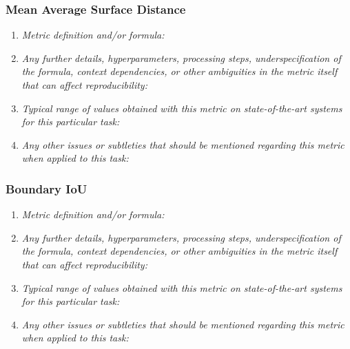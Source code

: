 \documentclass[a4paper,11pt]{article}
\begin{document}
        \subsubsection{Mean Average Surface Distance}
            \begin{enumerate}[label=\alph*.]
                \item \textit{Metric definition and/or formula:}
                \bigskip
                \item \textit{Any further details, hyperparameters, processing steps, underspecification of the formula, context dependencies, or other ambiguities in the metric itself that can affect reproducibility:}
                \bigskip
                \item \textit{Typical range of values obtained with this metric on state-of-the-art systems for this particular task:}
                \bigskip
                \item \textit{Any other issues or subtleties that should be mentioned regarding this metric when applied to this task:}
                \bigskip
            \end{enumerate}
        \subsubsection{Boundary IoU}
            \begin{enumerate}[label=\alph*.]
                \item \textit{Metric definition and/or formula:}
                \bigskip
                \item \textit{Any further details, hyperparameters, processing steps, underspecification of the formula, context dependencies, or other ambiguities in the metric itself that can affect reproducibility:}
                \bigskip
                \item \textit{Typical range of values obtained with this metric on state-of-the-art systems for this particular task:}
                \bigskip
                \item \textit{Any other issues or subtleties that should be mentioned regarding this metric when applied to this task:}
                \bigskip
            \end{enumerate}
\end{document}
